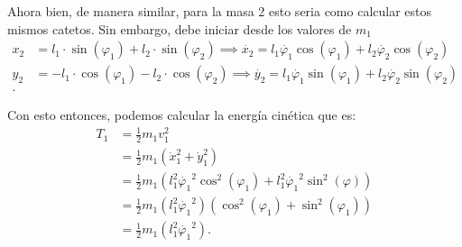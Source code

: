\documentclass{report}
\begin{document}
Ahora bien, de manera similar, para la masa 2 esto seria como calcular estos mismos catetos. Sin embargo, debe iniciar desde los valores de $m_1$
\begin{align*}
  x_2 &= l_1\cdot \sin\left(\varphi_1\right) + l_2 \cdot \sin\left( \varphi_2 \right) \implies \dot{x_2} = l_1\dot{\varphi_1}\cos\left( \varphi_1 \right) + l_2 \dot{\varphi_2}\cos\left( \varphi_2 \right)  \\
  y_2 &= -l_1\cdot \cos\left(\varphi_1\right) - l_2 \cdot \cos\left( \varphi_2 \right) \implies \dot{y_2} = l_1\dot{\varphi_1}\sin\left( \varphi_1 \right) + l_2 \dot{\varphi_2}\sin\left( \varphi_2 \right)  \\
.\end{align*}

Con esto entonces, podemos calcular la energía cinética que es:
\begin{align*}
  T_1 &= \frac{1}{2}m_1v_1^2 \\
      &= \frac{1}{2}m_1\left( \dot{x}_1^2 + \dot{y}_1^2 \right)  \\
      &= \frac{1}{2}m_1\left( l_1^2\dot{\varphi_1}^2\cos^2\left( \varphi_1 \right) + l_1^2\dot{\varphi_1}^2 \sin^2\left( \varphi \right)  \right)  \\
      &= \frac{1}{2}m_1\left( l_1^2\dot{\varphi_1}^2 \right)\left( \cos^2\left( \varphi_1 \right) + \sin^2\left( \varphi_1 \right)  \right)   \\
      &= \frac{1}{2}m_1\left( l_1^2\dot{\varphi_1}^2 \right)
.\end{align*}
\end{document}
